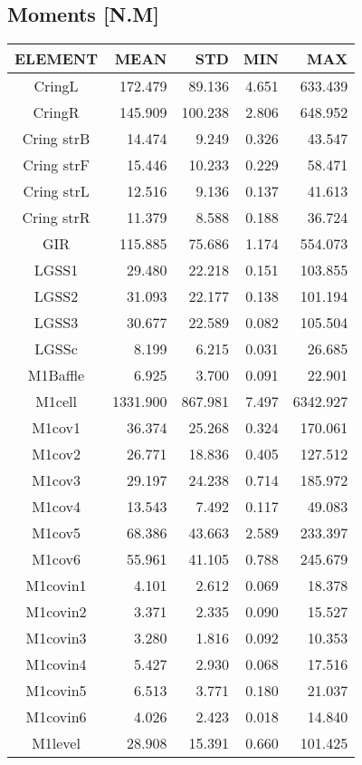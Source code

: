 \subsection{Moments [N.M]}
\begin{longtable}{crrrr}\toprule
 ELEMENT & MEAN & STD & MIN & MAX \\\hline
 CringL & 172.479 & 89.136 & 4.651 & 633.439 \\
 CringR & 145.909 & 100.238 & 2.806 & 648.952 \\
 Cring strB & 14.474 & 9.249 & 0.326 & 43.547 \\
 Cring strF & 15.446 & 10.233 & 0.229 & 58.471 \\
 Cring strL & 12.516 & 9.136 & 0.137 & 41.613 \\
 Cring strR & 11.379 & 8.588 & 0.188 & 36.724 \\
 GIR & 115.885 & 75.686 & 1.174 & 554.073 \\
 LGSS1 & 29.480 & 22.218 & 0.151 & 103.855 \\
 LGSS2 & 31.093 & 22.177 & 0.138 & 101.194 \\
 LGSS3 & 30.677 & 22.589 & 0.082 & 105.504 \\
 LGSSc & 8.199 & 6.215 & 0.031 & 26.685 \\
 M1Baffle & 6.925 & 3.700 & 0.091 & 22.901 \\
 M1cell & 1331.900 & 867.981 & 7.497 & 6342.927 \\
 M1cov1 & 36.374 & 25.268 & 0.324 & 170.061 \\
 M1cov2 & 26.771 & 18.836 & 0.405 & 127.512 \\
 M1cov3 & 29.197 & 24.238 & 0.714 & 185.972 \\
 M1cov4 & 13.543 & 7.492 & 0.117 & 49.083 \\
 M1cov5 & 68.386 & 43.663 & 2.589 & 233.397 \\
 M1cov6 & 55.961 & 41.105 & 0.788 & 245.679 \\
 M1covin1 & 4.101 & 2.612 & 0.069 & 18.378 \\
 M1covin2 & 3.371 & 2.335 & 0.090 & 15.527 \\
 M1covin3 & 3.280 & 1.816 & 0.092 & 10.353 \\
 M1covin4 & 5.427 & 2.930 & 0.068 & 17.516 \\
 M1covin5 & 6.513 & 3.771 & 0.180 & 21.037 \\
 M1covin6 & 4.026 & 2.423 & 0.018 & 14.840 \\
 M1level & 28.908 & 15.391 & 0.660 & 101.425 \\

\end{longtable}
